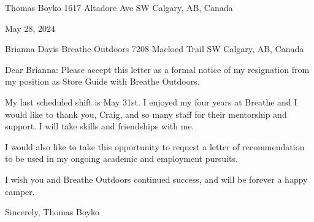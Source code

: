 
Thomas Boyko
1617 Altadore Ave SW
Calgary, AB, Canada

May 28, 2024

Brianna Davis
Breathe Outdoors
7208 Macloed Trail SW
Calgary, AB, Canada

Dear Brianna:
Please accept this letter as a formal notice of my resignation from my position as Store Guide with Breathe Outdoors.

My last scheduled shift is May 31st. I enjoyed my four years at Breathe and I would like to thank you, Craig, and so many staff for their mentorship and support.  I will take skills and friendships with me. 

I would also like to take this opportunity to request a letter of recommendation to be used in my ongoing academic and employment pursuits. 

I wish you and Breathe Outdoors continued success, and will be forever a happy camper.

Sincerely,
Thomas Boyko
